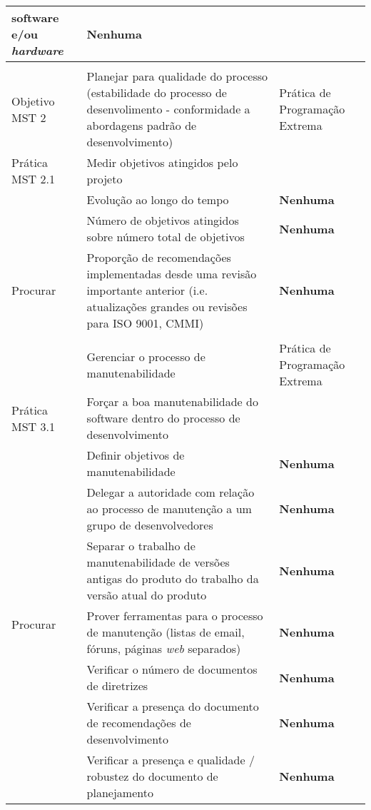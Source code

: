\begin{longtable}{|p{2cm}|p{7cm}|p{7cm}|}
  software e/ou \textit{hardware} &\textbf{Nenhuma} \\
  \hline
  & & \\
  \hline \cellcolor[gray]{0.6} Objetivo MST 2 & \cellcolor[gray]{0.6}
  Planejar para qualidade do processo (estabilidade do processo de
  desenvolimento - conformidade a abordagens padrão de
  desenvolvimento) & Prática de Programação Extrema \\
  \hline \cellcolor[gray]{0.9} Prática MST 2.1 &
  \cellcolor[gray]{0.9} Medir objetivos atingidos pelo projeto & \\
  \hline \multirow{5}{*}{Procurar} & Evolução ao longo do tempo &
  \textbf{Nenhuma} \\
  \cline{2-3} & Número de objetivos atingidos sobre número total de
  objetivos & \textbf{Nenhuma} \\
  \cline{2-3} & Proporção de recomendações implementadas desde uma
  revisão importante anterior (i.e. atualizações grandes ou revisões
  para ISO 9001, CMMI) & \textbf{Nenhuma} \\
  \hline
  & & \\
  \hline \cellcolor[gray]{0.6} Objetivo MST 3 & \cellcolor[gray]{0.6}
  Gerenciar o processo de manutenabilidade & Prática de Programação
  Extrema \\
  \hline \cellcolor[gray]{0.9} Prática MST 3.1 & \cellcolor[gray]{0.9}
  Forçar a boa manutenabilidade do software dentro do processo de
  desenvolvimento & \\
  \hline \multirow{8}{*}{Procurar} & Definir objetivos de
  manutenabilidade & \textbf{Nenhuma} \\
  \cline{2-3} & Delegar a autoridade com relação ao processo de
  manutenção a um grupo de desenvolvedores  &\textbf{Nenhuma} \\
  \cline{2-3} & Separar o trabalho de manutenabilidade de versões
  antigas do produto do trabalho da versão atual do produto
  &\textbf{Nenhuma} \\
  \cline{2-3} & Prover ferramentas para o processo de manutenção
  (listas de email, fóruns, páginas \textit{web} separados)
  &\textbf{Nenhuma} \\
  \cline{2-3} & Verificar o número de documentos de diretrizes
  &\textbf{Nenhuma} \\
  \cline{2-3} & Verificar a presença do documento de recomendações
  de desenvolvimento &\textbf{Nenhuma} \\
  \cline{2-3} & Verificar a presença e qualidade / robustez do
  documento de planejamento &\textbf{Nenhuma} \\

\end{longtable}
